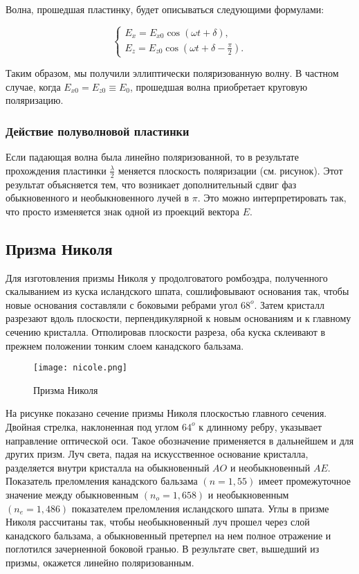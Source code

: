 Волна, прошедшая пластинку, будет описываться следующими формулами:

\begin{equation*}
 \begin{cases}
   E_x = E_{x0} \cos (\omega t + \delta),
   \\
   E_z = E_{z0} \cos \left(\omega t + \delta - \frac{\pi}{2} \right).
 \end{cases}
\end{equation*}

Таким образом, мы получили эллиптически поляризованную волну. В частном случае, когда $E_{x0} = E_{z0} \equiv E_0$, прошедшая волна приобретает круговую поляризацию. 
\subsubsection{Действие полуволновой пластинки}

Если падающая волна была линейно поляризованной, то в результате прохождения пластинки $\frac{\lambda}{2}$ меняется плоскость поляризации (см. рисунок). Этот результат объясняется тем, что возникает дополнительный сдвиг фаз обыкновенного и необыкновенного лучей в $\pi$. Это можно интерпретировать так, что просто изменяется знак одной из проекций вектора $E$.


\subsection{Призма Николя}

Для изготовления призмы Николя у продолговатого ромбоэдра, полученного скалыванием из куска исландского шпата, сошлифовывают основания так, чтобы новые основания составляли с боковыми ребрами угол $68^o$. Затем кристалл разрезают вдоль плоскости, перпендикулярной к новым основаниям и к главному сечению кристалла. Отполировав плоскости разреза, оба куска склеивают в прежнем положении тонким слоем канадского бальзама.

\begin{figure}[h!]
    \centering
    \texttt{[image: nicole.png]}
    \caption{Призма Николя}
    \label{fig:my_label}
\end{figure} 

На рисунке показано сечение призмы Николя плоскостью главного сечения. Двойная стрелка, наклоненная под углом $64^o$ к длинному ребру, указывает направление оптической оси. Такое обозначение применяется в дальнейшем и для других призм. Луч света, падая на искусственное основание кристалла, разделяется внутри кристалла на обыкновенный $AO$ и необыкновенный $AE$. Показатель преломления канадского бальзама $(n = 1,55)$ имеет промежуточное значение между обыкновенным $(n_o = 1,658)$ и необыкновенным $(n_e = 1,486) $ показателем преломления исландского шпата. Углы в призме Николя рассчитаны так, чтобы необыкновенный луч прошел через слой канадского бальзама, а обыкновенный претерпел на нем полное отражение и поглотился зачерненной боковой гранью. В результате свет, вышедший из призмы, окажется линейно поляризованным.

